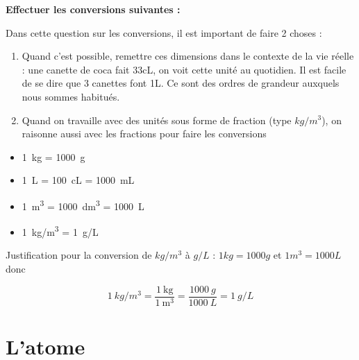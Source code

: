 \documentclass{exam}
\begin{document}
\begin{questions}
  \question[2] \textbf{Effectuer les conversions suivantes :}

  Dans cette question sur les conversions, il est important de faire 2 choses :

  \begin{enumerate}
    \item Quand c'est possible, remettre ces dimensions dans le contexte de la vie réelle : une canette de coca fait 33cL, on voit cette unité au quotidien. Il est facile de se dire que 3 canettes font 1L. Ce sont des ordres de grandeur auxquels nous sommes habitués.
    \item Quand on travaille avec des unités sous forme de fraction (type $kg/m^3$), on raisonne aussi avec les fractions pour faire les conversions
  \end{enumerate}

  \begin{itemize}
    \item \SI{1}{kg} = \SI{1000}{g}
    \item \SI{1}{L} = \SI{100}{cL} = \SI{1000}{mL}
    \item \SI{1}{m^3} = \SI{1000}{dm^3} = \SI{1000}{L}
    \item \SI{1}{kg/m^3} = \SI{1}{g/L}
  \end{itemize}

Justification pour la conversion de $kg/m^3$ à $g/L$ : $1 kg = 1000 g$ et $1 m^3 = 1000 L$ donc 

\[
  \SI{1}{kg/m^3} = \frac{\SI{1}{\kilogram}}{\SI{1}{\cubic\meter}} = \frac{\SI{1000}{g}}{\SI{1000}{L}} = \SI{1}{g/L}
\]

\end{questions}

\section*{L'atome}
\end{document}
